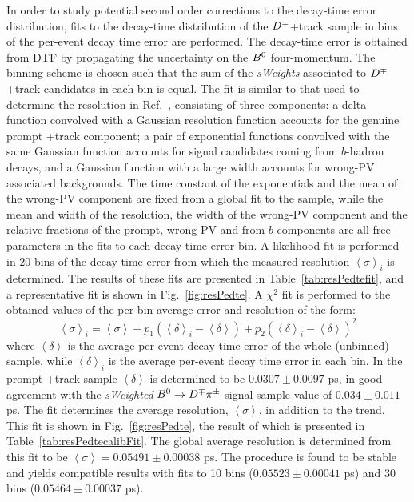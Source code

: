 In order to study potential second order corrections to the decay-time error distribution, fits to the decay-time distribution of the $D^\mp$+track sample in bins of the per-event decay time error are performed. The decay-time error is obtained from DTF by propagating the uncertainty on the $B^0$ four-momentum. The binning scheme is chosen such that the sum of the \emph{sWeights} associated to $D^\mp$+track candidates in each bin is equal. The fit is similar to that used to determine the resolution in Ref.~\cite{LHCb-PAPER-2014-059}, consisting of three components: a delta function convolved with a Gaussian resolution function accounts for the genuine prompt \Dpm+track component; a pair of exponential functions convolved with the same Gaussian function accounts for signal candidates coming from $b$-hadron decays, and a Gaussian function with a large width accounts for wrong-PV associated backgrounds. The time constant of the exponentials and the mean of the wrong-PV component are fixed from a global fit to the sample, while the mean and width of the resolution, the width of the wrong-PV component and the relative fractions of the prompt, wrong-PV and from-$b$ components are all free parameters in the fits to each decay-time error bin. A likelihood fit is performed in 20 bins of the decay-time error from which the measured resolution $\left<\sigma\right>_{i}$ is determined. The results of these fits are presented in Table~\ref{tab:resPedtefit}, and a representative fit is shown in Fig.~\ref{fig:resPedte}. A $\chi^{2}$ fit is performed to the obtained values of the per-bin average error and resolution of the form:
\begin{equation}
	\left<\sigma\right>_{i} = \left<\sigma\right> + p_{1} \left(\left<\delta\right>_{i} - \left<\delta\right>\right) + p_{2} \left(\left<\delta\right>_{i} - \left<\delta\right>\right)^{2}
\end{equation}
where $\left<\delta\right>$ is the average per-event decay time error of the whole (unbinned) sample, while $\left<\delta\right>_{i}$ is the average per-event decay time error in each bin. In the prompt \Dmp+track sample $\left<\delta\right>$ is determined to be $0.0307\pm0.0097$ ps, in good agreement with the \emph{sWeighted} $B^0\rightarrow D^\mp\pi^\pm$ signal sample value of $0.034\pm0.011$ ps. The fit determines the average resolution, $\left<\sigma\right>$, in addition to the trend. This fit is shown in Fig.~\ref{fig:resPedte}, the result of which is presented in Table~\ref{tab:resPedtecalibFit}. The global average resolution is determined from this fit to be $\left<\sigma\right>=0.05491\pm 0.00038$ ps. The procedure is found to be stable and yields compatible results with fits to 10 bins ($ 0.05523\pm 0.00041$ ps) and 30 bins ($0.05464\pm 0.00037$ ps). 

